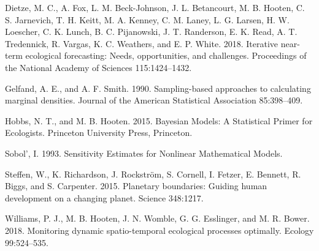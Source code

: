 \documentclass[12pt,]{article}
\begin{document}
\leavevmode\hypertarget{ref-Dietze2018}{}%
Dietze, M. C., A. Fox, L. M. Beck-Johnson, J. L. Betancourt, M. B.
Hooten, C. S. Jarnevich, T. H. Keitt, M. A. Kenney, C. M. Laney, L. G.
Larsen, H. W. Loescher, C. K. Lunch, B. C. Pijanowski, J. T. Randerson,
E. K. Read, A. T. Tredennick, R. Vargas, K. C. Weathers, and E. P.
White. 2018. Iterative near-term ecological forecasting: Needs,
opportunities, and challenges. Proceedings of the National Academy of
Sciences 115:1424--1432.

\leavevmode\hypertarget{ref-Gelfand1990}{}%
Gelfand, A. E., and A. F. Smith. 1990. Sampling-based approaches to
calculating marginal densities. Journal of the American Statistical
Association 85:398--409.

\leavevmode\hypertarget{ref-Hobbs2015}{}%
Hobbs, N. T., and M. B. Hooten. 2015. Bayesian Models: A Statistical
Primer for Ecologists. Princeton University Press, Princeton.

\leavevmode\hypertarget{ref-Sobol1993}{}%
Sobol', I. 1993. Sensitivity Estimates for Nonlinear Mathematical
Models.

\leavevmode\hypertarget{ref-Steffen2015}{}%
Steffen, W., K. Richardson, J. Rockström, S. Cornell, I. Fetzer, E.
Bennett, R. Biggs, and S. Carpenter. 2015. Planetary boundaries: Guiding
human development on a changing planet. Science 348:1217.

\leavevmode\hypertarget{ref-Williams2018}{}%
Williams, P. J., M. B. Hooten, J. N. Womble, G. G. Esslinger, and M. R.
Bower. 2018. Monitoring dynamic spatio-temporal ecological processes
optimally. Ecology 99:524--535.
\end{document}

